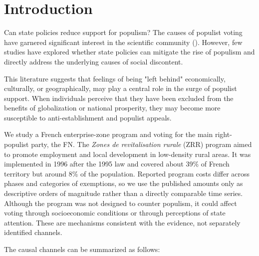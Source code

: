 \section{Introduction}

Can state policies reduce support for populism? The causes of populist voting have garnered significant interest in the scientific community (\cite{Guriev2022}). However, few studies have explored whether state policies can mitigate the rise of populism and directly address the underlying causes of social discontent.

This literature suggests that feelings of being "left behind" economically, culturally, or geographically, may play a central role in the surge of populist support. When individuals perceive that they have been excluded from the benefits of globalization or national prosperity, they may become more susceptible to anti-establishment and populist appeals.

We study a French enterprise-zone program and voting for the main right-populist party, the FN. The \textit{Zones de revitalisation rurale} (ZRR) program aimed to promote employment and local development in low-density rural areas. It was implemented in 1996 after the 1995 law and covered about 39\% of French territory but around 8\% of the population. Reported program costs differ across phases and categories of exemptions, so we use the published amounts only as descriptive orders of magnitude rather than a directly comparable time series. Although the program was not designed to counter populism, it could affect voting through socioeconomic conditions or through perceptions of state attention. These are mechanisms consistent with the evidence, not separately identified channels.




The causal channels can be summarized as follows:
\vspace{0.5cm}


